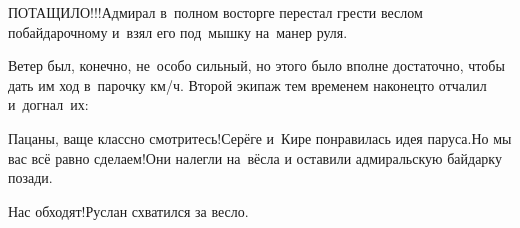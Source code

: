 

\diagdash ПОТАЩИЛО!!!\mdash Адмирал в~полном восторге перестал грести веслом по\sdash байдарочному и~взял его под~мышку на~манер руля.%

Ветер был, конечно, не~особо сильный, но этого было вполне достаточно, чтобы дать им ход в~парочку км/ч. Второй экипаж тем временем наконец\sdash то отчалил и~догнал~их:

\diagdash Пацаны, ваще классно смотритесь!\mdash Серёге и~Кире понравилась идея паруса.\mdash Но мы вас всё равно сделаем!\mdash Они налегли на~вёсла и оставили адмиральскую байдарку позади.

%
%	
%	
%	
%	
%

\diagdash Нас обходят!\mdash Руслан схватился за весло.

